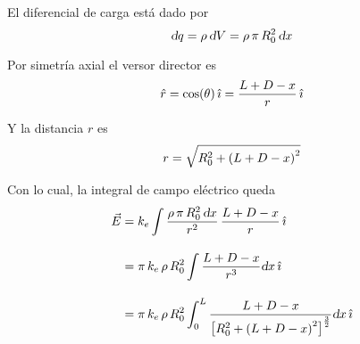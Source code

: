\documentclass[a5paper,12pt,twoside]{book}
\begin{document}
\begin{mdframed}[style=MyFrame2]

    El diferencial de carga está dado por
    \begin{equation*}
        \textsl{d} q = \rho \, \textsl{d} V
        = \rho \, \pi \, R_0^2 \, \textsl{d} x
    \end{equation*}

    Por simetría axial el versor director es
    \begin{equation*}
        \hat{r} = \cos(\theta) \, \hat{\imath}
        = \frac{L+D-x}{r} \, \hat{\imath}
    \end{equation*}

    Y la distancia $r$ es
    \begin{equation*}
        r = \sqrt{R_0^2 + \left(L+D-x\right)^2}
    \end{equation*}

    Con lo cual, la integral de campo eléctrico queda
    \begin{align*}
        \vec{E} &= k_e \int \frac{\rho \, \pi \, R_0^2 \, \textsl{d} x}{r^2} \, \frac{L+D-x}{r} \, \hat{\imath}
        \\[1em]
        &= \pi \, k_e \, \rho \, R_0^2 \int \frac{L+D-x}{r^3} \textsl{d} x \, \hat{\imath}
        \\[1em]
        &= \pi \, k_e \, \rho \, R_0^2 \int_0^L \frac{L+D-x}{{ \begin{bmatrix} R_0^2 + \left(L+D-x\right)^2 \end{bmatrix} }^{\frac{3}{2}}} \textsl{d} x \, \hat{\imath}
    \end{align*}
\end{mdframed}
\end{document}
